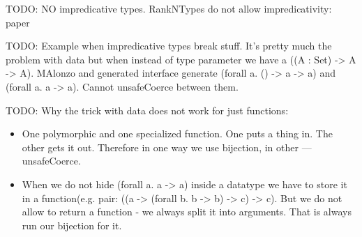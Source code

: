 TODO: NO impredicative types. RankNTypes do not allow impredicativity: paper\cite{SPJ11}

TODO: Example when impredicative types break stuff. It's pretty much the problem with
data but when instead of type parameter we have a ((A : Set) -> A -> A). MAlonzo and
generated interface generate (forall a. () -> a -> a) and (forall a. a -> a). Cannot
unsafeCoerce between them.

TODO: Why the trick with data does not work for just functions:
\begin{itemize}
\item One polymorphic and one specialized function. One puts a thing in. The other
      gets it out. Therefore in one way we use bijection, in other --- unsafeCoerce.
\item When we do not hide (forall a. a -> a) inside a datatype we have to store it
      in a function(e.g. pair: ((a -> (forall b. b -> b) -> c) -> c). But we do not
      allow to return a function - we always split it into arguments. That is always
      run our bijection for it.
\end{itemize}
